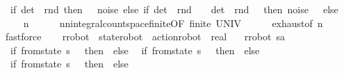 \begin{isabellebody}
\ \ if\ det\ {\isacharequal}{\kern0pt}\ rnd\ then\ {}\ {\isacharminus}{\kern0pt}\ noise\ else\ if\ det\ {\isacharequal}{\kern0pt}\ rnd\ {\isacharminus}{\kern0pt}\ {}\ {\isasymor}\ det\ {\isacharequal}{\kern0pt}\ rnd\ {\isacharplus}{\kern0pt}\ {}\ then\ noise\ {\isacharslash}{\kern0pt}\ {}\ else\ {}{\isacharparenright}{\kern0pt}{\isachardoublequoteclose}\isanewline
%
\isadelimproof
\ \ %
\endisadelimproof
%
\isatagproof
{}\isamarkupfalse%
\ \ n\isanewline
\ \ \ \ \isamarkupfalse%
\ nn{\isacharunderscore}{\kern0pt}integral{\isacharunderscore}{\kern0pt}count{\isacharunderscore}{\kern0pt}space{\isacharunderscore}{\kern0pt}finite{\isacharbrackleft}{\kern0pt}OF\ finite{\isacharbrackright}{\kern0pt}\ UNIV{\isacharunderscore}{\kern0pt}{}\isanewline
\ \ \ \ \isamarkupfalse%
\ exhaust{\isacharunderscore}{\kern0pt}{}{\isacharbrackleft}{\kern0pt}of\ n{\isacharbrackright}{\kern0pt}\isanewline
\ \ \ \ \isamarkupfalse%
\ fastforce\isanewline
\ \ \isamarkupfalse%
%
\endisatagproof
{\isafoldproof}%
%
\isadelimproof
\isanewline
%
\endisadelimproof
\isanewline
{}\isamarkupfalse%
\ r{\isacharunderscore}{\kern0pt}robot\ {\isacharcolon}{\kern0pt}{\isacharcolon}{\kern0pt}\ {\isachardoublequoteopen}{\isacharparenleft}{\kern0pt}state{\isacharunderscore}{\kern0pt}robot\ {\isasymtimes}\ action{\isacharunderscore}{\kern0pt}robot{\isacharparenright}{\kern0pt}\ {\isasymRightarrow}\ real{\isachardoublequoteclose}\ \isanewline
\ \ {\isachardoublequoteopen}r{\isacharunderscore}{\kern0pt}robot\ {\isacharparenleft}{\kern0pt}s{\isacharcomma}{\kern0pt}a{\isacharparenright}{\kern0pt}\ {\isacharequal}{\kern0pt}\ {\isacharparenleft}{\kern0pt}\isanewline
\ \ if\ from{\isacharunderscore}{\kern0pt}state\ s\ {\isacharequal}{\kern0pt}\ {\isacharparenleft}{\kern0pt}{}{\isacharcomma}{\kern0pt}{}{\isacharparenright}{\kern0pt}\ then\ {}\ else\isanewline
\ \ if\ from{\isacharunderscore}{\kern0pt}state\ s\ {\isacharequal}{\kern0pt}\ {\isacharparenleft}{\kern0pt}{}{\isacharcomma}{\kern0pt}{}{\isacharparenright}{\kern0pt}\ then\ {\isacharminus}{\kern0pt}{}\ else\ \isanewline
\ \ if\ from{\isacharunderscore}{\kern0pt}state\ s\ {\isacharequal}{\kern0pt}\ {\isacharparenleft}{\kern0pt}{}{\isacharcomma}{\kern0pt}{}{\isacharparenright}{\kern0pt}\ then\ {}\ else\isanewline
\ \ {}{\isacharparenright}{\kern0pt}{\isachardoublequoteclose}\isanewline

\end{isabellebody}
